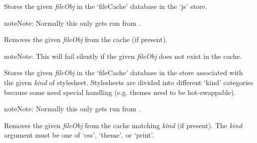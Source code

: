 \documentclass[letterpaper,10pt,openany]{sphinxmanual}
\begin{document}
\begin{fulllineitems}
\begin{fulllineitems}
\begin{fulllineitems}
\end{fulllineitems}



\begin{fulllineitems}
\label{Developer/js_gateone:GateOne.Storage.cacheJS}
Stores the given \emph{fileObj} in the `fileCache' database in the `js' store.

\begin{notice}{note}{Note:}
Normally this only gets run from {\hyperref[Developer/js_gateone:GateOne.Utils.loadJSAction]{}}.
\end{notice}

\end{fulllineitems}



\begin{fulllineitems}
\label{Developer/js_gateone:GateOne.Storage.uncacheJS}
Removes the given \emph{fileObj} from the cache (if present).

\begin{notice}{note}{Note:}
This will fail silently if the given \emph{fileObj} does not exist in the cache.
\end{notice}

\end{fulllineitems}



\begin{fulllineitems}
\label{Developer/js_gateone:GateOne.Storage.cacheStyle}
Stores the given \emph{fileObj} in the `fileCache' database in the store associated with the given \emph{kind} of stylesheet.  Stylesheets are divided into different `kind' categories because some need special handling (e.g. themes need to be hot-swappable).

\begin{notice}{note}{Note:}
Normally this only gets run from {\hyperref[Developer/js_gateone:GateOne.Utils.loadStyleAction]{}}.
\end{notice}

\end{fulllineitems}



\begin{fulllineitems}
\label{Developer/js_gateone:GateOne.Storage.uncacheStyle}
Removes the given \emph{fileObj} from the cache matching \emph{kind} (if present).  The \emph{kind} argument must be one of `css', `theme', or `print'.


\end{fulllineitems}
\end{fulllineitems}
\end{fulllineitems}
\end{document}
